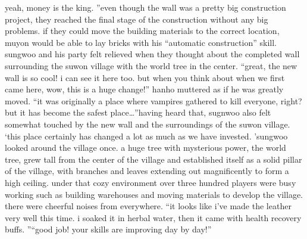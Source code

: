  yeah, money is the king.
”even though the wall was a pretty big construction project, they reached the final stage of the construction without any big problems.
 if they could move the building materials to the correct location, muyon would be able to lay bricks with his “automatic construction” skill.
sungwoo and his party felt relieved when they thought about the completed wall surrounding the suwon village with the world tree in the center.
“great, the new wall is so cool! i can see it here too.
 but when you think about when we first came here, wow, this is a huge change!” hanho muttered as if he was greatly moved.
“it was originally a place where vampires gathered to kill everyone, right? but it has become the safest place…”having heard that, sugnwoo also felt somewhat touched by the new wall and the surroundings of the suwon village.
‘this place certainly has changed a lot as much as we have invested.
'sungwoo looked around the village once.
a huge tree with mysterious power, the world tree, grew tall from the center of the village and established itself as a solid pillar of the village, with branches and leaves extending out magnificently to form a high ceiling.
under that cozy environment over three hundred players were busy working such as building warehouses and moving materials to develop the village.
there were cheerful noises from everywhere.
“it looks like i've made the leather very well this time.
 i soaked it in herbal water, then it came with health recovery buffs.
”“good job! your skills are improving day by day!”

